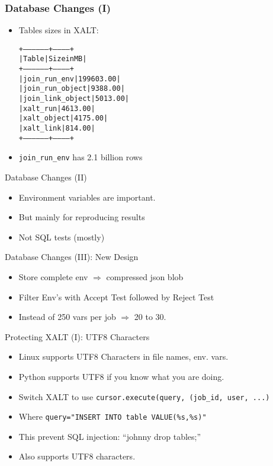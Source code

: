 \documentclass{beamer}
\begin{document}
\begin{frame}[fragile]
    \frametitle{Database Changes (I)}
  \begin{itemize}
      \item Tables sizes in XALT:
 {\small
    \begin{alltt}
+------------------+------------+
| Table            | Size in MB |
+------------------+------------+
| join_run_env     |  199603.00 |
| join_run_object  |    9388.00 |
| join_link_object |    5013.00 |
| xalt_run         |    4613.00 |
| xalt_object      |    4175.00 |
| xalt_link        |     814.00 |
+------------------+------------+
    \end{alltt}
}
    \item \texttt{join\_run\_env} has 2.1 billion rows
  \end{itemize}
\end{frame}

\begin{frame}{Database Changes (II)}
  \begin{itemize}
    \item Environment variables are important.
    \item But mainly for reproducing results
    \item Not SQL tests (mostly)
  \end{itemize}
\end{frame}

\begin{frame}{Database Changes (III): New Design}
  \begin{itemize}
    \item Store complete env $\Rightarrow$ compressed json blob
    \item Filter Env's with Accept Test followed by Reject Test
    \item Instead of 250 vars per job $\Rightarrow$ 20 to 30.
  \end{itemize}
\end{frame}

\begin{frame}{Protecting XALT (I): UTF8 Characters}
  \begin{itemize}
    \item Linux supports UTF8 Characters in file names, env. vars.
    \item Python supports UTF8 if you know what you are doing.
    \item Switch XALT to use \texttt{cursor.execute(query, (job\_id,
        user, ...)}
    \item Where \texttt{query="INSERT INTO table VALUE(\%s,\%s)"}
    \item This prevent SQL injection: ``johnny drop tables;''
    \item Also supports UTF8 characters.
  \end{itemize}
\end{frame}
\end{document}
